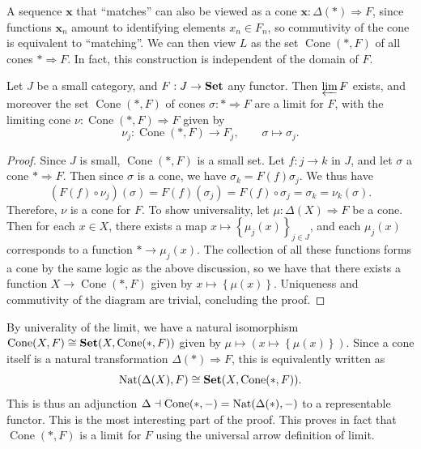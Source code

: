 A sequence $\mathbf{x} $ that ``matches'' can also be viewed as a cone $\mathbf{x} : \Delta (*) \Rightarrow F$, since functions $\mathbf{x} _n$ amount to identifying elements $x_n\in F_n$, so commutivity of the cone is equivalent to ``matching''. We can then view $L$ as the set $\operatorname{Cone} (*,F)$ of all cones $*\Rightarrow F$. In fact, this construction is independent of the domain of $F$.

\begin{theorem}\label{thm:5.1}
	Let $J$ be a small category, and $F : J \to \mathbf{Set} $ any functor. Then $\varprojlim F$ exists, and moreover the set $\operatorname{Cone} (*,F)$ of cones $\sigma :*\Rightarrow F$ are a limit for $F$, with the limiting cone $\nu : \operatorname{Cone} (*,F) \Rightarrow F$ given by
	\[
		\nu _j : \operatorname{Cone} (*,F) \to F_j,\qquad \sigma \mapsto \sigma _j
	.\]
\end{theorem}
\begin{proof}
	Since $J$ is small, $\operatorname{Cone} (*,F)$ is a small set. Let $f : j \to k$ in $J$, and let $\sigma $ a cone $*\Rightarrow F$. Then since $\sigma $ is a cone, we have $\sigma _k = F(f)\sigma _j$. We thus have
	\[
		(F(f)\circ \nu _j)(\sigma )=F(f)(\sigma _j)=F(f)\circ \sigma _j=\sigma_k=\nu _k(\sigma )
	.\]
	Therefore, $\nu $ is a cone for $F$. To show universality, let $\mu : \Delta (X) \Rightarrow F$ be a cone. Then for each $x\in X$, there exists a map $x\mapsto \left\{ \mu_j(x) \right\}_{j\in J} $, and each $\mu _j(x)$ corresponds to a function $*\to \mu _j(x)$. The collection of all these functions forms a cone by the same logic as the above discussion, so we have that there exists a function $X\to \operatorname{Cone} (*,F)$ given by $x\mapsto \left\{ \mu (x) \right\} $. Uniqueness and commutivity of the diagram are trivial, concluding the proof.
\end{proof}

By univerality of the limit, we have a natural isomorphism $\operatorname{Cone} (X,F)\cong \mathbf{Set} (X,\operatorname{Cone} (*,F))$ given by $\mu \mapsto (x\mapsto \left\{ \mu (x) \right\} )$. Since a cone itself is a natural transformation $\Delta (*)\Rightarrow F$, this is equivalently written as
\[
	\operatorname{Nat}(\Delta (X),F)\cong \mathbf{Set} (X,\operatorname{Cone} (*,F))
.\]
This is thus an adjunction $\Delta \dashv \operatorname{Cone} (*,-)=\operatorname{Nat}(\Delta (*),-)$ to a representable functor. This is the most interesting part of the proof. This proves in fact that $\operatorname{Cone} (*,F)$ is a limit for $F$ using the universal arrow definition of limit.

